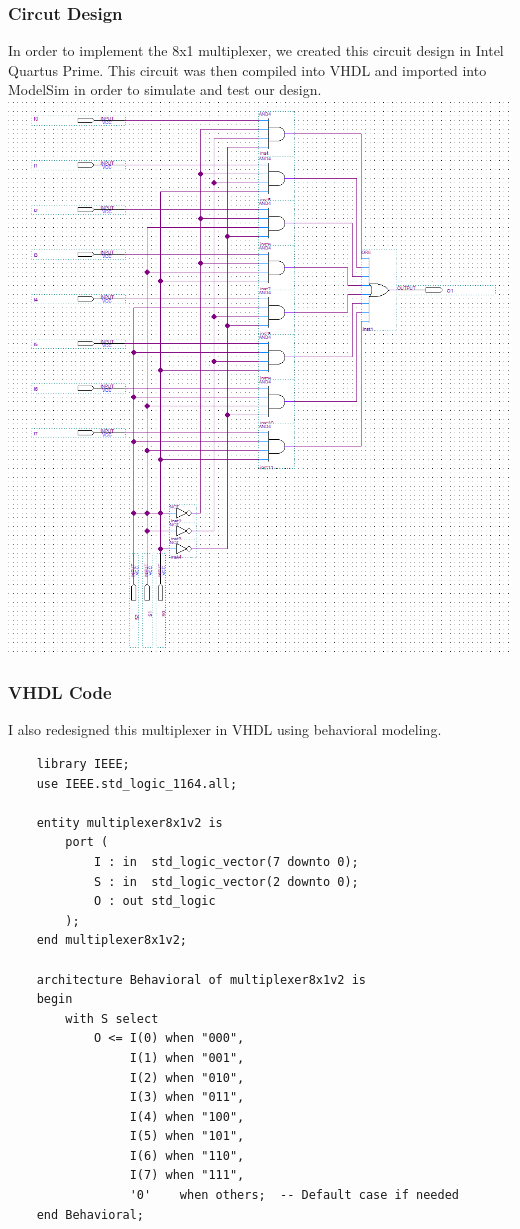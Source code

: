 \documentclass[12pt]{article}
\begin{document}
\subsubsection{Circut Design}
In order to implement the 8x1 multiplexer, we created this circuit design in Intel Quartus Prime.
This circuit was then compiled into VHDL and imported into ModelSim in order to simulate and test our design. \\
\includegraphics[width=\textwidth]{8x1multiplexer.png}
\clearpage
\subsubsection{VHDL Code}
I also redesigned this multiplexer in VHDL using behavioral modeling.
\begin{verbatim}
    library IEEE;
    use IEEE.std_logic_1164.all;
    
    entity multiplexer8x1v2 is
        port (
            I : in  std_logic_vector(7 downto 0);
            S : in  std_logic_vector(2 downto 0);
            O : out std_logic
        );
    end multiplexer8x1v2;
    
    architecture Behavioral of multiplexer8x1v2 is
    begin
        with S select
            O <= I(0) when "000",
                 I(1) when "001",
                 I(2) when "010",
                 I(3) when "011",
                 I(4) when "100",
                 I(5) when "101",
                 I(6) when "110",
                 I(7) when "111",
                 '0'    when others;  -- Default case if needed
    end Behavioral;
\end{verbatim}
\clearpage
\end{document}

